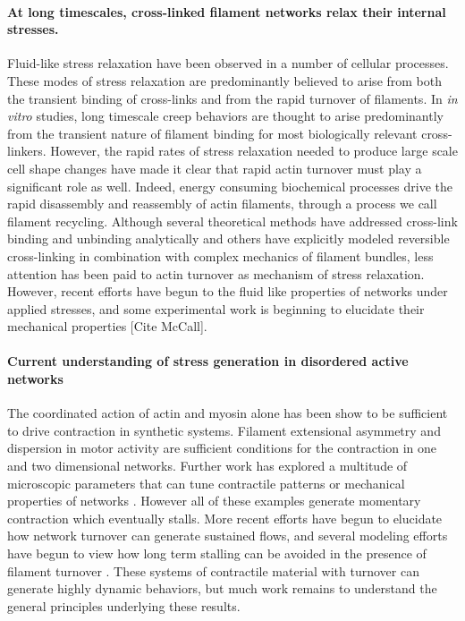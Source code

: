 \documentclass[10pt,letterpaper]{article}
\begin{document}
\paragraph{At long timescales, cross-linked filament networks relax their internal stresses.} Fluid-like stress relaxation have been observed in a number of cellular processes\cite{cellmech_flows,cellmech_flows2,cellmech_flows3,rheo_fluid,rheo_fluid2,cell_rheo_exp}.  These modes of stress relaxation are predominantly believed to arise from both the transient binding of cross-links and from the rapid turnover of filaments.  In {\em in vitro} studies, long timescale creep behaviors are thought to arise predominantly from the transient nature of filament binding for most biologically relevant cross-linkers\cite{rheo_crosslinksmatter,rheo_crosslinkslip1,rheo_crosslinkslip2,rheo_crosslinkslip3,rheo_nonaffine}.  However, the rapid rates of stress relaxation needed to produce large scale cell shape changes have made it clear that rapid actin turnover must play a significant role as well.  Indeed, energy consuming biochemical processes drive the rapid disassembly and reassembly of actin filaments, through a process we call filament recycling.   Although several theoretical methods have addressed cross-link binding and unbinding analytically \cite{theo_crosslinkslip1,theo_crosslinkslip2} and others have explicitly modeled reversible cross-linking in combination with complex mechanics of filament bundles\cite{model_taeyoon,rheo_crosslinkslip2,theo_crosslinkslip3}, less attention has been paid to actin turnover as mechanism of stress relaxation. However, recent efforts have begun to the fluid like properties of networks under applied stresses\cite{Kim2014526}, and some experimental work is beginning to elucidate their mechanical properties [Cite McCall].

\paragraph{Current understanding of stress generation in disordered active networks }

The coordinated action of actin and myosin alone has been show to be sufficient to drive contraction in synthetic systems\cite{rheo_2D1}.  Filament extensional asymmetry and dispersion in motor activity are sufficient conditions for the contraction in one \cite{1367-2630-14-3-033037} and two \cite{PhysRevX.4.041002} dimensional networks.  Further work has explored a multitude of microscopic parameters that can tune contractile patterns \cite{10.1371/journal.pone.0039869,Alvarado:2013aa,C0SM00494D} or mechanical properties of networks \cite{0295-5075-85-1-18007,rheo_active}.  However all of these examples generate momentary contraction which eventually stalls.  More recent efforts have begun to elucidate how network turnover can generate sustained flows\cite{10.1371/journal.pone.0000696}, and several modeling efforts have begun to view how long term stalling can be avoided in the presence of filament turnover \cite{2015arXiv150706182H,Mak:2016aa}. These systems of contractile material with turnover can generate highly dynamic behaviors\cite{PhysRevLett.113.148102}, but much work remains to understand the general principles underlying these results.
\end{document}

